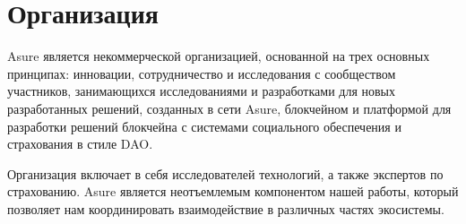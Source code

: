 \section{Организация}
Asure является некоммерческой организацией, основанной на трех основных принципах: инновации, сотрудничество и исследования с сообществом участников, занимающихся исследованиями и разработками для новых разработанных решений, созданных в сети Asure, блокчейном и платформой для разработки решений блокчейна с системами социального обеспечения и страхования в стиле DAO.
\newline

Организация включает в себя исследователей технологий, а также экспертов по страхованию. Asure является неотъемлемым компонентом нашей работы, который позволяет нам координировать взаимодействие в различных частях экосистемы.